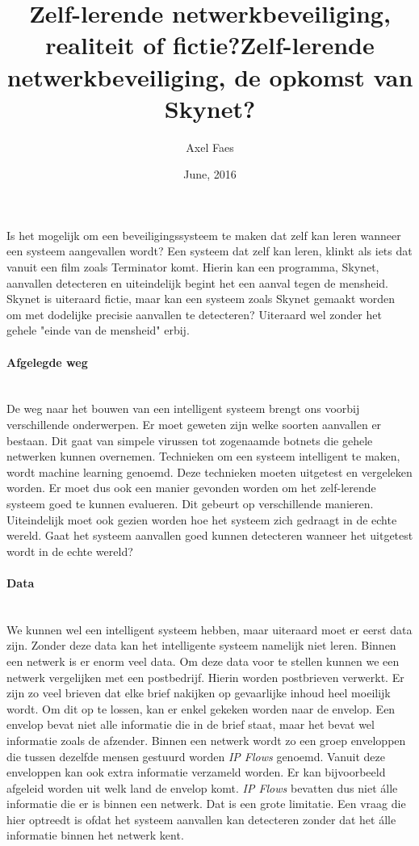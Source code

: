 \documentclass[notitlepage]{article}
\title{Zelf-lerende netwerkbeveiliging, realiteit of fictie?}
\title{Zelf-lerende netwerkbeveiliging, de opkomst van Skynet?}
\author{Axel Faes}
\date{June, 2016}
\begin{document}
\maketitle

Is het mogelijk om een beveiligingssysteem te maken dat zelf kan leren wanneer een systeem aangevallen wordt? Een systeem dat zelf kan leren, klinkt als iets dat vanuit een film zoals Terminator komt. Hierin kan een programma, Skynet, aanvallen detecteren en uiteindelijk begint het een aanval tegen de mensheid. Skynet is uiteraard fictie, maar kan een systeem zoals Skynet gemaakt worden om met dodelijke precisie aanvallen te detecteren? Uiteraard wel zonder het gehele "einde van de mensheid" erbij.

\paragraph{Afgelegde weg}\mbox{}\\
De weg naar het bouwen van een intelligent systeem brengt ons voorbij verschillende onderwerpen. Er moet geweten zijn welke soorten aanvallen er bestaan. Dit gaat van simpele virussen tot zogenaamde botnets die gehele netwerken kunnen overnemen. Technieken om een systeem intelligent te maken, wordt machine learning genoemd. Deze technieken moeten uitgetest en vergeleken worden. Er moet dus ook een manier gevonden worden om het zelf-lerende systeem goed te kunnen evalueren. Dit gebeurt op verschillende manieren. Uiteindelijk moet ook gezien worden hoe het systeem zich gedraagt in de echte wereld. Gaat het systeem aanvallen goed kunnen detecteren wanneer het uitgetest wordt in de echte wereld? 

\paragraph{Data}\mbox{}\\
We kunnen wel een intelligent systeem hebben, maar uiteraard moet er eerst data zijn. Zonder deze data kan het intelligente systeem namelijk niet leren. Binnen een netwerk is er enorm veel data. Om deze data voor te stellen kunnen we een netwerk vergelijken met een postbedrijf. Hierin worden postbrieven verwerkt. Er zijn zo veel brieven dat elke brief nakijken op gevaarlijke inhoud heel moeilijk wordt. Om dit op te lossen, kan er enkel gekeken worden naar de envelop. Een envelop bevat niet alle informatie die in de brief staat, maar het bevat wel informatie zoals de afzender. Binnen een netwerk wordt zo een groep enveloppen die tussen dezelfde mensen gestuurd worden \textit{IP Flows }genoemd. Vanuit deze enveloppen kan ook extra informatie verzameld worden. Er kan bijvoorbeeld afgeleid worden uit welk land de envelop komt. \textit{IP Flows} bevatten dus niet \'alle informatie die er is binnen een netwerk. Dat is een grote limitatie. Een vraag die hier optreedt is ofdat het systeem aanvallen kan detecteren zonder dat het \'alle informatie binnen het netwerk kent.
\end{document}
